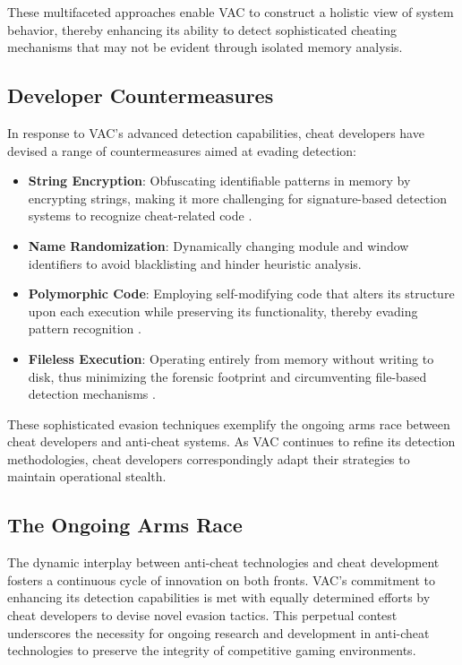 These multifaceted approaches enable VAC to construct a holistic view of system behavior, thereby enhancing its ability to detect sophisticated cheating mechanisms that may not be evident through isolated memory analysis.

\subsection*{Developer Countermeasures}

In response to VAC's advanced detection capabilities, cheat developers have devised a range of countermeasures aimed at evading detection:

\begin{itemize}
    \item \textbf{String Encryption}: Obfuscating identifiable patterns in memory by encrypting strings, making it more challenging for signature-based detection systems to recognize cheat-related code \parencite{glanz2020obfuscated}.
    \item \textbf{Name Randomization}: Dynamically changing module and window identifiers to avoid blacklisting and hinder heuristic analysis.
    \item \textbf{Polymorphic Code}: Employing self-modifying code that alters its structure upon each execution while preserving its functionality, thereby evading pattern recognition \parencite{morel2023polymorphic}.
    \item \textbf{Fileless Execution}: Operating entirely from memory without writing to disk, thus minimizing the forensic footprint and circumventing file-based detection mechanisms \parencite{crowdstrike2024fileless}.
\end{itemize}

These sophisticated evasion techniques exemplify the ongoing arms race between cheat developers and anti-cheat systems. As VAC continues to refine its detection methodologies, cheat developers correspondingly adapt their strategies to maintain operational stealth.

\subsection*{The Ongoing Arms Race}

The dynamic interplay between anti-cheat technologies and cheat development fosters a continuous cycle of innovation on both fronts. VAC's commitment to enhancing its detection capabilities is met with equally determined efforts by cheat developers to devise novel evasion tactics. This perpetual contest underscores the necessity for ongoing research and development in anti-cheat technologies to preserve the integrity of competitive gaming environments.

